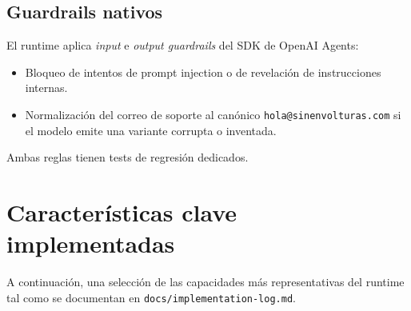 \documentclass[11pt,a4paper]{article}
\begin{document}
\subsection{Guardrails nativos}

El runtime aplica \emph{input} e \emph{output guardrails} del SDK de
OpenAI Agents:

\begin{itemize}[leftmargin=*,itemsep=1pt]
  \item Bloqueo de intentos de prompt injection o de revelación de
        instrucciones internas.
  \item Normalización del correo de soporte al canónico
        \texttt{hola@sinenvolturas.com} si el modelo emite una variante
        corrupta o inventada.
\end{itemize}

Ambas reglas tienen tests de regresión dedicados.

\section{Características clave implementadas}

A continuación, una selección de las capacidades más representativas del
runtime tal como se documentan en \texttt{docs/implementation-log.md}.
\end{document}
